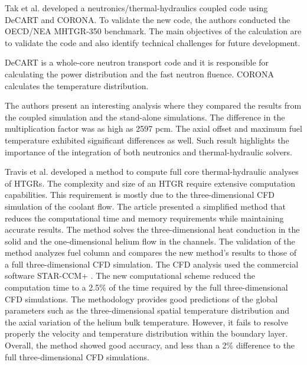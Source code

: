 \documentclass[11pt,letterpaper]{article}
\begin{document}
Tak et al. \cite{tak_coupled_2016} developed a neutronics/thermal-hydraulics coupled code using DeCART \cite{kaeri_decart_2007} and CORONA.
To validate the new code, the authors conducted the OECD/NEA MHTGR-350 benchmark.
The main objectives of the calculation are to validate the code and also identify technical challenges for future development.

DeCART is a whole-core neutron transport code and it is responsible for calculating the power distribution and the fast neutron fluence.
CORONA calculates the temperature distribution.

The authors present an interesting analysis where they compared the results from the coupled simulation and the stand-alone simulations.
The difference in the multiplication factor was as high as 2597 pcm.
The axial offset and maximum fuel temperature exhibited significant differences as well.
Such result highlights the importance of the integration of both neutronics and thermal-hydraulic solvers.

Travis et al. \cite{travis_thermalhydraulics_2013} developed a method to compute full core thermal-hydraulic analyses of \glspl{HTGR}.
The complexity and size of an \gls{HTGR} require extensive computation capabilities.
This requirement is mostly due to the three-dimensional CFD simulation of the coolant flow.
The article presented a simplified method that reduces the computational time and memory requirements while maintaining accurate results.
The method solves the three-dimensional heat conduction in the solid and the one-dimensional helium flow in the channels.
The validation of the method analyzes fuel column and compares the new method's results to those of a full three-dimensional CFD simulation.
The CFD analysis used the commercial software STAR-CCM+ \cite{cd-adapco_star-ccm_2012}.
The new computational scheme reduced the computation time to a 2.5\% of the time required by the full three-dimensional CFD simulations.
The methodology provides good predictions of the global parameters such as the three-dimensional spatial temperature distribution and the axial variation of the helium bulk temperature.
However, it fails to resolve properly the velocity and temperature distribution within the boundary layer.
Overall, the method showed good accuracy, and less than a 2\% difference to the full three-dimensional CFD simulations.
\end{document}
